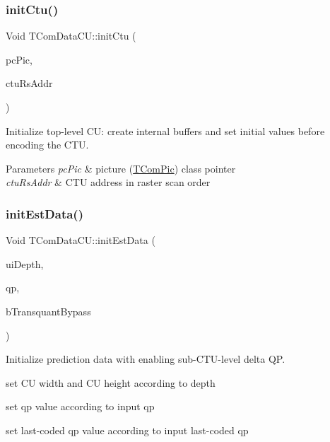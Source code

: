 \subsubsection{\texorpdfstring{init\+Ctu()}{initCtu()}}
{\footnotesize\ttfamily Void T\+Com\+Data\+C\+U\+::init\+Ctu (\begin{DoxyParamCaption}\item[{\hyperlink{class_t_com_pic}{T\+Com\+Pic} $\ast$}]{pc\+Pic,  }\item[{U\+Int}]{ctu\+Rs\+Addr }\end{DoxyParamCaption})}

Initialize top-\/level CU\+: create internal buffers and set initial values before encoding the C\+TU.


\begin{DoxyParams}{Parameters}
{\em pc\+Pic} & picture (\hyperlink{class_t_com_pic}{T\+Com\+Pic}) class pointer \\
\hline
{\em ctu\+Rs\+Addr} & C\+TU address in raster scan order \\
\hline
\end{DoxyParams}
\mbox{\label{class_t_com_data_c_u_aedc8736217f3c4bb6056748fe57f932f}} 
\subsubsection{\texorpdfstring{init\+Est\+Data()}{initEstData()}}
{\footnotesize\ttfamily Void T\+Com\+Data\+C\+U\+::init\+Est\+Data (\begin{DoxyParamCaption}\item[{const U\+Int}]{ui\+Depth,  }\item[{const Int}]{qp,  }\item[{const Bool}]{b\+Transquant\+Bypass }\end{DoxyParamCaption})}

Initialize prediction data with enabling sub-\/\+C\+T\+U-\/level delta QP.
\begin{DoxyItemize}
\item set CU width and CU height according to depth
\item set qp value according to input qp
\item set last-\/coded qp value according to input last-\/coded qp
\end{DoxyItemize}


